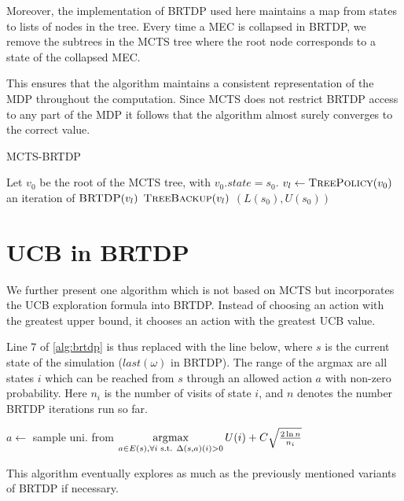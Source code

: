Moreover, the implementation of BRTDP used here maintains a map from
states to lists of nodes in the tree. Every time a MEC
is collapsed in BRTDP, we remove the subtrees in the MCTS tree where the root node
corresponds to a state of the collapsed MEC.

This ensures that the algorithm maintains a consistent representation of
the MDP throughout the computation. Since MCTS does not restrict BRTDP
access to any part of the MDP it follows that the algorithm almost
surely converges to the correct value.

\begin{algorithm}
\caption{MCTS-BRTDP}
\label{mcts-brtdp}
\begin{algorithmic}[1]
    \State Let $v_0$ be the root of the MCTS tree, with $v_0.state = s_0$.
        \State $v_l \gets \Call{TreePolicy}{v_0}$
        \State an iteration of $\Call{BRTDP}{v_l}$
        \State $\Call{TreeBackup}{v_l}$
    \EndWhile
    \State \Return $(L(s_0), U(s_0))$
\EndFunction

\end{algorithmic}
\end{algorithm}

\pagebreak

\section{UCB in BRTDP}

We further present one algorithm which is not based on MCTS but
incorporates the UCB exploration formula into BRTDP. Instead of choosing
an action with the greatest upper bound, it chooses an action with the
greatest UCB value.

Line 7 of \autoref{alg:brtdp} is thus replaced with the line below,
where $s$ is the current state of the simulation ($last(\omega)$
in BRTDP). The range of the argmax are all states $i$ which can be
reached from $s$ through an allowed action $a$ with non-zero
probability. Here $n_i$ is the number of visits of state $i$,
and $n$ denotes the number BRTDP iterations run so far.

\bigskip
\begin{algorithmic}
    \State $a \gets$ sample uni. from
    $\operatorname*{\arg\!\max}\limits_{a \in E(s), \forall i \text{ s.t. } \Delta(s,a)(i) > 0}
        U(i) + C \sqrt{ \frac{2 \ln n}{n_i} }$
\end{algorithmic}
\bigskip


This algorithm eventually explores as much as the previously mentioned
variants of BRTDP if necessary.


